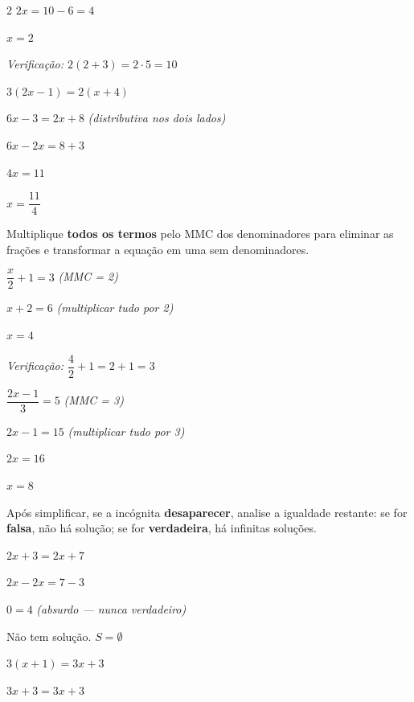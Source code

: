 \documentclass[12pt]{article}
\begin{document}
\begin{multicols}{2}
$2x = 10 - 6 = 4$

$x = 2$

\textit{Verificação: $2(2+3) = 2\cdot5 = 10$ \checkmark}

\vspace{6pt}

 $3(2x - 1) = 2(x + 4)$

$6x - 3 = 2x + 8$ \hfill {\small\textit{(distributiva nos dois lados)}}

$6x - 2x = 8 + 3$

$4x = 11$

$x = \dfrac{11}{4}$


Multiplique \textbf{todos os termos} pelo MMC dos denominadores para eliminar as frações e transformar a equação em uma sem denominadores.

 $\dfrac{x}{2} + 1 = 3$ \hfill {\small\textit{(MMC = 2)}}

$x + 2 = 6$ \hfill {\small\textit{(multiplicar tudo por 2)}}

$x = 4$

\textit{Verificação: $\dfrac{4}{2}+1 = 2+1 = 3$ \checkmark}

\vspace{6pt}

 $\dfrac{2x - 1}{3} = 5$ \hfill {\small\textit{(MMC = 3)}}

$2x - 1 = 15$ \hfill {\small\textit{(multiplicar tudo por 3)}}

$2x = 16$

$x = 8$


Após simplificar, se a incógnita \textbf{desaparecer}, analise a igualdade restante: se for \textbf{falsa}, não há solução; se for \textbf{verdadeira}, há infinitas soluções.


$2x + 3 = 2x + 7$

$2x - 2x = 7 - 3$

$0 = 4$ \hfill {\small\textit{(absurdo — nunca verdadeiro)}}

Não tem solução. $S = \emptyset$


$3(x + 1) = 3x + 3$

$3x + 3 = 3x + 3$


\end{multicols}
\end{document}
